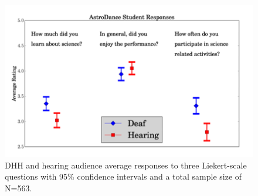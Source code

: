 \documentclass[11.5pt]{sig-alternate} %
\begin{document}
\begin{large}
\begin{figure}[!h]
    \centering
    \includegraphics[width=1\linewidth]{Fig_7.png}
    \caption{DHH and hearing audience average responses to three Liekert-scale questions with 95\% confidence intervals and a total sample size of N=563.}
\end{figure}


\end{large}
\end{document}
